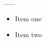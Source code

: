 \begin{tabular}{...}...  %

\begin{itemize}
    \item Item one \\     %
    \item Item two \\     %
\end{itemize}






\setcounter{secnumdepth}{2}
%



\end{tabular}
